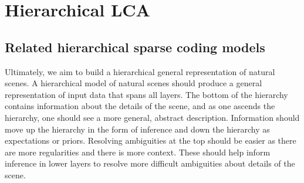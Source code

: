 \chapter{Hierarchical LCA}

\section{Related hierarchical sparse coding models}\label{sec:ch3_related_models}
Ultimately, we aim to build a hierarchical general representation of natural scenes. A hierarchical model of natural scenes should produce a general representation of input data that spans all layers. The bottom of the hierarchy contains information about the details of the scene, and as one ascends the hierarchy, one should see a more general, abstract description. Information should move up the hierarchy in the form of inference and down the hierarchy as expectations or priors. Resolving ambiguities at the top should be easier as there are more regularities and there is more context. These should help inform inference in lower layers to resolve more difficult ambiguities about details of the scene.

